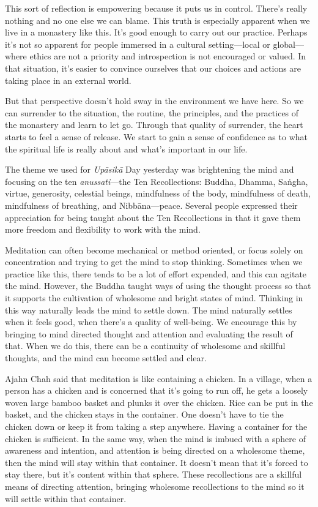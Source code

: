 This sort of reflection is empowering because it puts us in control. 
There's really nothing and no one else we can blame. This truth is 
especially apparent when we live in a monastery like this. It's good 
enough to carry out our practice. Perhaps it's not so apparent for 
people immersed in a cultural setting---local or global---where ethics 
are not a priority and introspection is not encouraged or valued. In 
that situation, it's easier to convince ourselves that our choices and 
actions are taking place in an external world.

But that perspective doesn't hold sway in the environment we have here. 
So we can surrender to the situation, the routine, the principles, and 
the practices of the monastery and learn to let go. Through that 
quality of surrender, the heart starts to feel a sense of release. We 
start to gain a sense of confidence as to what the spiritual life is 
really about and what's important in our life.


The theme we used for \emph{Upāsikā} Day yesterday was brightening 
the mind and focusing on the ten \emph{anussati}---the Ten 
Recollections: Buddha, Dhamma, Saṅgha, virtue, generosity, celestial 
beings, mindfulness of the body, mindfulness of death, mindfulness of 
breathing, and Nibbāna---peace. Several people expressed their 
appreciation for being taught about the Ten Recollections in that it 
gave them more freedom and flexibility to work with the mind.

Meditation can often become mechanical or method oriented, or focus 
solely on concentration and trying to get the mind to stop thinking. 
Sometimes when we practice like this, there tends to be a lot of effort 
expended, and this can agitate the mind. However, the Buddha taught 
ways of using the thought process so that it supports the cultivation 
of wholesome and bright states of mind. Thinking in this way naturally 
leads the mind to settle down. The mind naturally settles when it feels 
good, when there's a quality of well-being. We encourage this by 
bringing to mind directed thought and attention and evaluating the 
result of that. When we do this, there can be a continuity of wholesome 
and skillful thoughts, and the mind can become settled and clear.

Ajahn Chah said that meditation is like containing a chicken. In a 
village, when a person has a chicken and is concerned that it's going 
to run off, he gets a loosely woven large bamboo basket and plunks it 
over the chicken. Rice can be put in the basket, and the chicken stays 
in the container. One doesn't have to tie the chicken down or keep it 
from taking a step anywhere. Having a container for the chicken is 
sufficient. In the same way, when the mind is imbued with a sphere of 
awareness and intention, and attention is being directed on a wholesome 
theme, then the mind will stay within that container. It doesn't mean 
that it's forced to stay there, but it's content within that sphere. 
These recollections are a skillful means of directing attention, 
bringing wholesome recollections to the mind so it will settle within 
that container.

